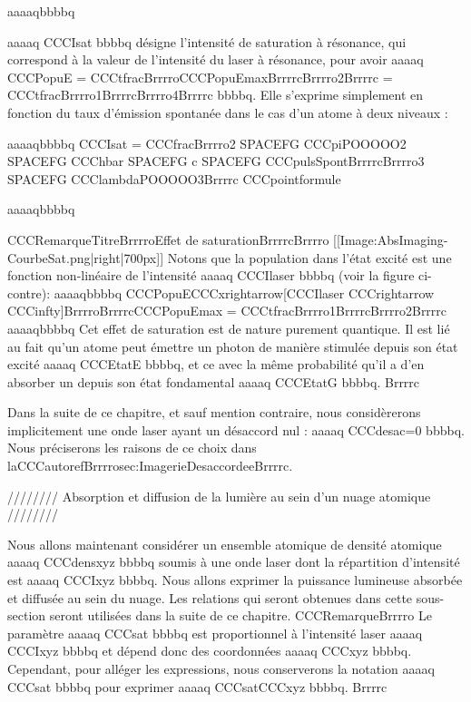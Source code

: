 aaaaqbbbbq





aaaaq CCCIsat bbbbq désigne l'intensité de saturation à résonance, qui correspond à la valeur de l'intensité du laser à résonance, pour avoir aaaaq CCCPopuE = CCCtfracBrrrroCCCPopuEmaxBrrrrcBrrrro2Brrrrc = CCCtfracBrrrro1BrrrrcBrrrro4Brrrrc bbbbq. 
Elle s'exprime simplement en fonction du taux d'émission spontanée dans le cas d'un atome à deux niveaux :



aaaaqbbbbq
	CCCIsat = CCCfracBrrrro2 SPACEFG CCCpiPOOOOO2 SPACEFG CCChbar SPACEFG c SPACEFG CCCpulsSpontBrrrrcBrrrro3 SPACEFG CCClambdaPOOOOO3Brrrrc
	CCCpointformule
	
aaaaqbbbbq



CCCRemarqueTitreBrrrroEffet de saturationBrrrrcBrrrro
[[Image:AbsImaging-CourbeSat.png|right|700px]]
Notons que la population dans l'état excité est une fonction non-linéaire de l'intensité aaaaq CCCIlaser bbbbq (voir la figure ci-contre):
aaaaqbbbbq
CCCPopuECCCxrightarrow[CCCIlaser CCCrightarrow CCCinfty]BrrrroBrrrrcCCCPopuEmax = CCCtfracBrrrro1BrrrrcBrrrro2Brrrrc
aaaaqbbbbq
Cet effet de saturation est de nature purement quantique. Il est lié au fait qu'un atome peut émettre un photon de manière stimulée depuis son état excité aaaaq CCCEtatE bbbbq, et ce avec la même probabilité qu'il a d'en absorber un depuis son état fondamental aaaaq CCCEtatG bbbbq.
Brrrrc



Dans la suite de ce chapitre, et sauf mention contraire, nous considèrerons implicitement une onde laser ayant un désaccord nul : aaaaq CCCdesac=0 bbbbq. Nous préciserons les raisons de ce choix dans laCCCautorefBrrrrosec:ImagerieDesaccordeeBrrrrc.


//////// Absorption et diffusion de la lumière au sein d'un nuage atomique ////////
 
Nous allons maintenant considérer un ensemble atomique de densité atomique aaaaq CCCdensxyz bbbbq soumis à une onde laser dont la répartition d'intensité est aaaaq CCCIxyz bbbbq. 
Nous allons exprimer la puissance lumineuse absorbée et diffusée au sein du nuage. Les relations qui seront obtenues dans cette sous-section seront utilisées dans la suite de ce chapitre.
CCCRemarqueBrrrro
Le paramètre aaaaq CCCsat bbbbq est proportionnel à l'intensité laser aaaaq CCCIxyz bbbbq et dépend donc des coordonnées aaaaq CCCxyz bbbbq. Cependant, pour alléger les expressions, nous conserverons la notation aaaaq CCCsat bbbbq pour exprimer aaaaq CCCsatCCCxyz bbbbq.
Brrrrc



